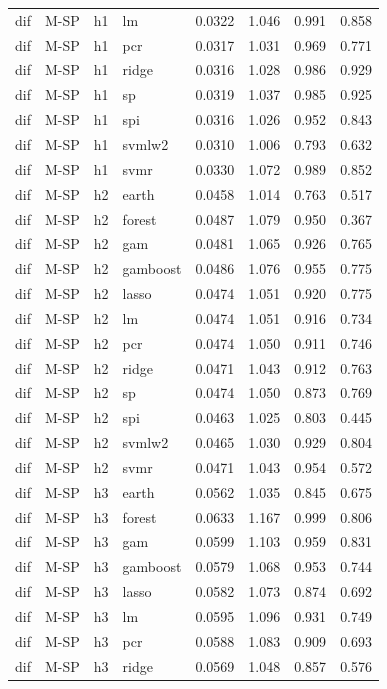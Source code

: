 \begin{ThreePartTable}
\begin{longtable}[t]{llclcccc}
dif & M-SP & h1 & lm & 0.0322 & 1.046 & 0.991 & 0.858\\
dif & M-SP & h1 & pcr & 0.0317 & 1.031 & 0.969 & 0.771\\
dif & M-SP & h1 & ridge & 0.0316 & 1.028 & 0.986 & 0.929\\
dif & M-SP & h1 & sp & 0.0319 & 1.037 & 0.985 & 0.925\\
dif & M-SP & h1 & spi & 0.0316 & 1.026 & 0.952 & 0.843\\
dif & M-SP & h1 & svmlw2 & 0.0310 & 1.006 & 0.793 & 0.632\\
dif & M-SP & h1 & svmr & 0.0330 & 1.072 & 0.989 & 0.852\\
\addlinespace
dif & M-SP & h2 & earth & 0.0458 & 1.014 & 0.763 & 0.517\\
dif & M-SP & h2 & forest & 0.0487 & 1.079 & 0.950 & 0.367\\
dif & M-SP & h2 & gam & 0.0481 & 1.065 & 0.926 & 0.765\\
dif & M-SP & h2 & gamboost & 0.0486 & 1.076 & 0.955 & 0.775\\
dif & M-SP & h2 & lasso & 0.0474 & 1.051 & 0.920 & 0.775\\
dif & M-SP & h2 & lm & 0.0474 & 1.051 & 0.916 & 0.734\\
dif & M-SP & h2 & pcr & 0.0474 & 1.050 & 0.911 & 0.746\\
dif & M-SP & h2 & ridge & 0.0471 & 1.043 & 0.912 & 0.763\\
dif & M-SP & h2 & sp & 0.0474 & 1.050 & 0.873 & 0.769\\
dif & M-SP & h2 & spi & 0.0463 & 1.025 & 0.803 & 0.445\\
dif & M-SP & h2 & svmlw2 & 0.0465 & 1.030 & 0.929 & 0.804\\
dif & M-SP & h2 & svmr & 0.0471 & 1.043 & 0.954 & 0.572\\
\addlinespace
dif & M-SP & h3 & earth & 0.0562 & 1.035 & 0.845 & 0.675\\
dif & M-SP & h3 & forest & 0.0633 & 1.167 & 0.999 & 0.806\\
dif & M-SP & h3 & gam & 0.0599 & 1.103 & 0.959 & 0.831\\
dif & M-SP & h3 & gamboost & 0.0579 & 1.068 & 0.953 & 0.744\\
dif & M-SP & h3 & lasso & 0.0582 & 1.073 & 0.874 & 0.692\\
dif & M-SP & h3 & lm & 0.0595 & 1.096 & 0.931 & 0.749\\
dif & M-SP & h3 & pcr & 0.0588 & 1.083 & 0.909 & 0.693\\
dif & M-SP & h3 & ridge & 0.0569 & 1.048 & 0.857 & 0.576\\

\end{longtable}
\end{ThreePartTable}

